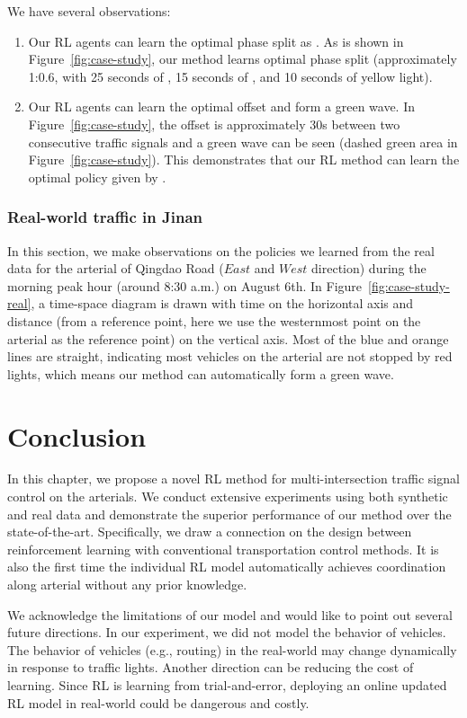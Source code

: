 We have several observations:
\begin{enumerate}[wide,noitemsep,topsep=0pt]
    \item Our RL agents can learn the optimal phase split as \Greenwave.  As is shown in Figure~\ref{fig:case-study}, our method learns optimal phase split (approximately 1:0.6, with 25 seconds of \WE, 15 seconds of \SN, and 10 seconds of yellow light). 
    \item Our RL agents can learn the optimal offset and form a green wave. In Figure~\ref{fig:case-study}, the offset is approximately 30s between two consecutive traffic signals and a green wave can be seen (dashed green area in Figure~\ref{fig:case-study}). This demonstrates that our RL method can learn the optimal policy given by \Greenwave. 
\end{enumerate}

\subsubsection{Real-world traffic in Jinan}

In this section, we make observations on the policies we learned from the real data for the arterial of Qingdao Road ($East$ and $West$ direction) during the morning peak hour (around 8:30 a.m.) on August 6th.  In Figure~\ref{fig:case-study-real}, a time-space diagram is drawn with time on the horizontal axis and distance (from a reference point, here we use the westernmost point on the arterial as the reference point) on the vertical axis. Most of the blue and orange lines are straight, indicating most vehicles on the arterial are not stopped by red lights, which means our method can automatically form a green wave.

\section{Conclusion}
In this chapter, we propose a novel RL method for multi-intersection traffic signal control on the arterials. We conduct extensive experiments using both synthetic and real data and demonstrate the superior performance of our method over the state-of-the-art. Specifically, we draw a connection on the design between reinforcement learning with conventional transportation control methods. It is also the first time the individual RL model automatically achieves coordination along arterial without any prior knowledge. 
 
 We acknowledge the limitations of our model and would like to point out several future directions. In our experiment, we did not model the behavior of vehicles. The behavior of vehicles (e.g., routing) in the real-world may change dynamically in response to traffic lights. Another direction can be reducing the cost of learning. Since RL is learning from trial-and-error, deploying an online updated RL model in real-world could be dangerous and costly.


